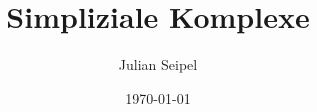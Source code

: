 \subject{Seminar: Simpliziale Topologie}
\title{Simpliziale Komplexe}
\author{Julian Seipel}
\date{\today}

\maketitle
\thispagestyle{empty}

\newpage
